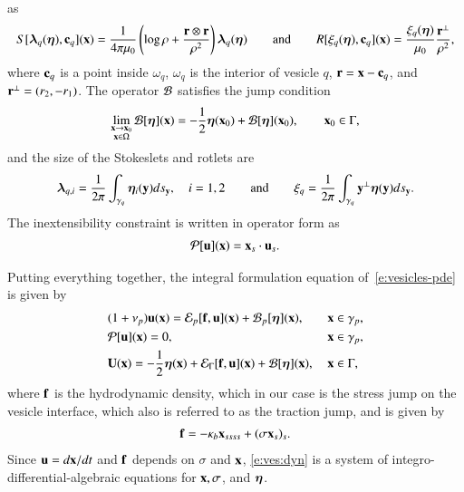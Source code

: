 as
\begin{align*}
  S[{\boldsymbol\lambda}_{q}({\boldsymbol\eta}),{\mathbf{c}}_{q}]({\mathbf{x}}) = \frac{1}{4\pi\mu_{0}}
    \left(\log \rho + \frac{{\mathbf{r}} \otimes {\mathbf{r}}}{\rho^{2}}\right)
    {\boldsymbol\lambda}_{q}({\boldsymbol\eta}) 
  \qquad \text{and} \qquad
  R[\xi_{q}({\boldsymbol\eta}),{\mathbf{c}}_{q}]({\mathbf{x}}) = \frac{\xi_{q}({\boldsymbol\eta})}{\mu_{0}}
    \frac{{\mathbf{r}}^{\perp}}{\rho^{2}},
\end{align*}
where ${\mathbf{c}}_{q}$ is a point inside $\omega_{q}$, $\omega_{q}$ is the
interior of vesicle $q$, ${\mathbf{r}}={\mathbf{x}} - {\mathbf{c}}_{q}$, and ${\mathbf{r}}^{\perp} =
(r_{2},-r_{1})$.  The operator ${\mathcal{B}}$ satisfies the jump condition
\begin{align*}
  \lim_{\substack{{\mathbf{x}} \rightarrow {\mathbf{x}}_{0} \\ {\mathbf{x}} \in \Omega}}
    {\mathcal{B}}[{\boldsymbol\eta}]({\mathbf{x}}) = -\frac{1}{2}{\boldsymbol\eta}({\mathbf{x}}_{0}) + 
    {\mathcal{B}}[{\boldsymbol\eta}]({\mathbf{x}}_{0}), \qquad {\mathbf{x}}_{0} \in \Gamma,
\end{align*}
and the size of the Stokeslets and rotlets are
\begin{align*}
  {\boldsymbol\lambda}_{q,i} = \frac{1}{2\pi} \int_{\gamma_{q}} 
    {\boldsymbol\eta}_{i}({\mathbf{y}}) ds_{{\mathbf{y}}}, \quad i=1,2
  \qquad \text{and} \qquad
  \xi_{q} = \frac{1}{2\pi}\int_{\gamma_{q}} {\mathbf{y}}^{\perp}
    {\boldsymbol\eta}({\mathbf{y}})ds_{{\mathbf{y}}}.
\end{align*}
The inextensibility constraint is written in operator form as
\begin{align*}
  \mathcal{P}[{\mathbf{u}}]({\mathbf{x}}) = {\mathbf{x}}_{s} \cdot {\mathbf{u}}_{s}.
\end{align*}

Putting everything together, the integral formulation equation of~\eqref{e:vesicles-pde} is
given by~\cite{rah:vee:bir}
\begin{subequations}
\label{e:ves:dyn}
\begin{align}
  &(1+\nu_{p}) {\mathbf{u}}({\mathbf{x}}) = {\mathcal{E}}_{p}[{\mathbf{f}},{\mathbf{u}}]({\mathbf{x}}) + 
  {\mathcal{B}}_{p}[{\boldsymbol\eta}]({\mathbf{x}}), \quad &&{\mathbf{x}} \in \gamma_{p},
  \label{e:vesicle:dynamic} \\
  &\mathcal{P}[{\mathbf{u}}]({\mathbf{x}}) = 0, &&{\mathbf{x}} \in \gamma_{p},
  \label{e:inextensibility} \\
  &\mathbf{U}({\mathbf{x}}) = -\frac{1}{2}{\boldsymbol\eta}({\mathbf{x}}) + {\mathcal{E}}_{\Gamma}[{\mathbf{f}},{\mathbf{u}}]({\mathbf{x}}) + 
    {\mathcal{B}}[{\boldsymbol\eta}]({\mathbf{x}}), &&{\mathbf{x}} \in \Gamma,
  \label{e:BIE}
\end{align}
\end{subequations}
where ${\mathbf{f}}$ is the hydrodynamic density, which in our case is the stress
jump on the vesicle interface, which also is referred to as the traction
jump, and is given by 
\begin{align*}
  {\mathbf{f}} = -\kappa_{b}{\mathbf{x}}_{ssss} + (\sigma {\mathbf{x}}_{s})_{s}.
\end{align*}
Since ${\mathbf{u}} = d{\mathbf{x}}/dt$ and ${\mathbf{f}}$ depends on $\sigma$ and
${\mathbf{x}}$, \eqref{e:ves:dyn} is a system of integro-differential-algebraic equations
for ${\mathbf{x}},\sigma$, and ${\boldsymbol\eta}$. 


